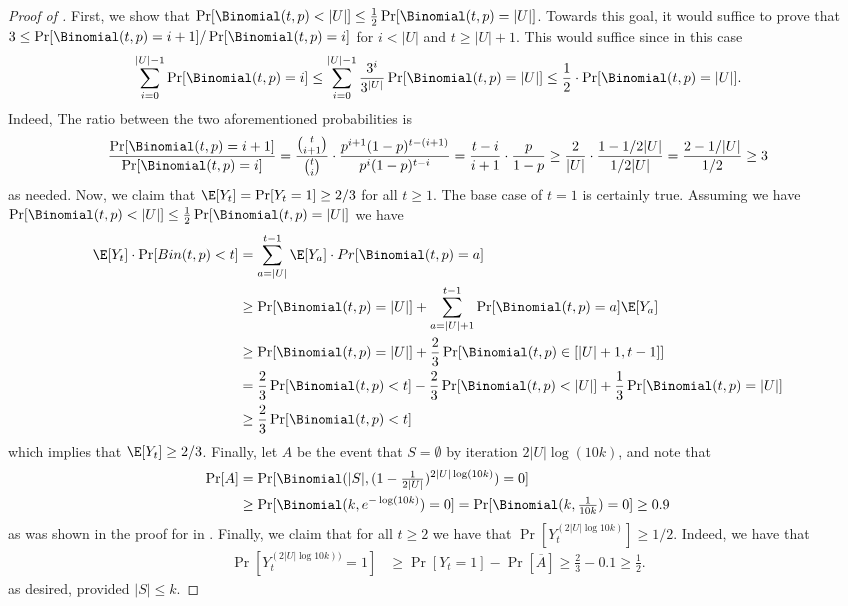 \begin{proof}[Proof of ]
First, we show that  $\Pr[\Binomial(t,p)<|U|] \le \frac{1}{2} \Pr[\Binomial(t,p)=|U|]$.
Towards this goal, it would suffice to prove
that $3\le \Pr[\Binomial(t,p)=i+1]/\Pr[\Binomial(t,p)=i]$ for $i<|U|$ and $t\ge|U|+1$. 
This would suffice since in this case $$\sum_{i=0}^{|U|-1} \Pr[\Binomial(t,p)=i] \le \sum_{i=0}^{|U|-1} \frac{3^{i}}{3^{|U|}} \Pr[\Binomial(t,p)=|U|] \le \frac{1}{2} \cdot \Pr[\Binomial(t,p)=|U|].$$
Indeed, The ratio between the two aforementioned probabilities is 
$$
\frac{\Pr[\Binomial(t,p)=i+1]}{\Pr[\Binomial(t,p)=i]} = \frac{\binom{t}{i+1}}{\binom{t}{i}} \cdot  \frac{p^{i+1}(1-p)^{t-(i+1)}}{p^{i}(1-p)^{t-i}} = 
\frac{t-i}{i+1} \cdot \frac{p}{1-p} \ge \frac{2}{|U|}\cdot \frac{1-1/2|U|}{1/2|U|} =\frac{2-1/|U|}{1/2}\ge 3
$$
as needed.
Now, we claim that $\E[Y_t] = \Pr[Y_t = 1] \geq 2/3$ for all $t \geq 1$. The base case of $t=1$ is certainly true. Assuming we have $\Pr[\Binomial(t,p)<|U|] \le \tfrac{1}{2}\Pr[\Binomial(t,p)=|U|]$ we have 
\begin{align*}
	\E[Y_t]\cdot \Pr[ Bin(t,p)<t] &=  
    \sum_{a=|U|}^{t-1} \E[Y_a] \cdot Pr[\Binomial(t,p)=a]\\
    &\ge \Pr[\Binomial(t,p)=|U|] + 
    \sum_{a=|U|+1}^{t-1} \Pr[\Binomial(t,p)=a]\E[Y_a]\\
    &\geq \Pr[\Binomial(t,p) = |U|] + \frac{2}{3}\Pr[\Binomial(t,p) \in [|U|+1,t-1]] \\
    &= \frac{2}{3} \Pr[\Binomial(t,p) <t] - \frac{2}{3}\Pr[\Binomial(t,p)<|U|] + \frac{1}{3}\Pr[\Binomial(t,p)=|U|]\\
    &\ge \frac{2}{3}\Pr[\Binomial(t,p)<t] 
\end{align*}
which implies that $\E[Y_t] \geq 2/3$. Finally, let $A$ be the event that $S = \emptyset$ by iteration $2|U|\log(10k)$, and note that 
\begin{align*}
\Pr[A] &= \Pr[\Binomial(|S|, (1-\tfrac{1}{2|U|})^{2|U|\log(10k)} )= 0] \\
%
&\geq \Pr[\Binomial(k, e^{-\log (10k)}) = 0]  = \Pr[\Binomial(k, \tfrac{1}{10k}) = 0] \geq 0.9
\end{align*}
as was shown in the proof for  in . Finally, we claim that for all $t\geq 2$ we have that $\Pr[Y_t^{(2|U|\log 10k)}]\geq 1/2$. Indeed, we have that
\begin{align*}
    \Pr[Y_t^{(2|U|\log 10k))} = 1] &\geq \Pr[Y_t=1] -\Pr[\overline{A}] \ge \tfrac{2}{3}-0.1    \geq \tfrac{1}{2}.
\end{align*}
as desired, provided $|S|\leq k$.
\end{proof}


